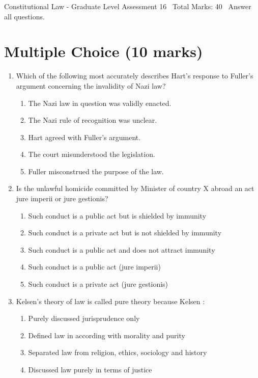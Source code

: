 \documentclass[12pt]{article}
\begin{document}
\begin{center}
Constitutional Law - Graduate Level Assessment 16 \
Total Marks: 40 \
Answer all questions.
\end{center}

\section*{Multiple Choice (10 marks)}
\begin{enumerate}[label=\arabic*.]
\item Which of the following most accurately describes Hart's response to Fuller's argument concerning the invalidity of Nazi law?
\begin{enumerate}[label=(\alph*)]
    \item The Nazi law in question was validly enacted.
    \item The Nazi rule of recognition was unclear.
    \item Hart agreed with Fuller's argument.
    \item The court misunderstood the legislation.
    \item Fuller misconstrued the purpose of the law.
\end{enumerate}
\item Is the unlawful homicide committed by Minister of country X abroad an act jure imperii or jure gestionis?
\begin{enumerate}[label=(\alph*)]
    \item Such conduct is a public act but is shielded by immunity
    \item Such conduct is a private act but is not shielded by immunity
    \item Such conduct is a public act and does not attract immunity
    \item Such conduct is a public act (jure imperii)
    \item Such conduct is a private act (jure gestionis)
\end{enumerate}
\item Kelsen's theory of law is called pure theory because Kelsen :
\begin{enumerate}[label=(\alph*)]
    \item Purely discussed jurisprudence only
    \item Defined law in according with morality and purity
    \item Separated law from religion, ethics, sociology and history
    \item Discussed law purely in terms of justice

\end{enumerate}
\end{enumerate}
\end{document}
